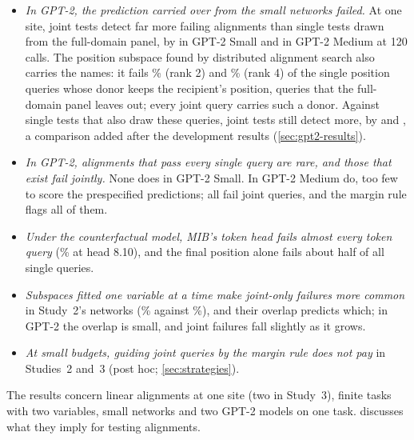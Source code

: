 \begin{itemize}
  was the weaker one. The margin rule, fixed on Study~2 and applied without change, flags exactly the
  \MsPerfectJointFailWord{} alignments that fail only jointly (\cref{sec:multisite}).
  \item \emph{In GPT-2, the prediction carried over from the small networks failed.} At one site, joint tests detect
  far more failing alignments than single tests drawn from the full-domain panel, by \ContrastS{} in GPT-2 Small and
  \ContrastM{} in GPT-2 Medium at 120 calls. The position subspace found by distributed alignment search also carries
  the names: it fails \UnchRTwoS\% (rank 2) and \UnchRFourS\% (rank 4) of the single position queries whose donor keeps
  the recipient's position, queries that the full-domain panel leaves out; every joint query carries such a donor.
  Against single tests that also draw these queries, joint tests still detect more, by \ContrastAllS{} and
  \ContrastAllM, a comparison added after the development results (\cref{sec:gpt2-results}).
  \item \emph{In GPT-2, alignments that pass every single query are rare, and those that exist fail jointly.} None does
  in GPT-2 Small. In GPT-2 Medium \PerfectWordM{} do, too few to score the prespecified predictions; all
  \PerfectWordM{} fail joint queries, and the margin rule flags all of them.
  \item \emph{Under the counterfactual model, MIB's token head fails almost every token query} (\HeadsRateB\% at head
  8.10), and the final position alone fails about half of all single queries.
  \item \emph{Subspaces fitted one variable at a time make joint-only failures more common} in Study~2's networks
  (\DShare\% against \DRefShare\%), and their overlap predicts which; in GPT-2 the overlap is small, and joint failures
  fall slightly as it grows.
  \item \emph{At small budgets, guiding joint queries by the margin rule does not pay} in Studies~2 and~3 (post hoc;
  \cref{sec:strategies}).
\end{itemize}

The results concern linear alignments at one site (two in Study~3), finite tasks with two variables, small networks
and two GPT-2 models on one task.  discusses what they imply for testing alignments.
